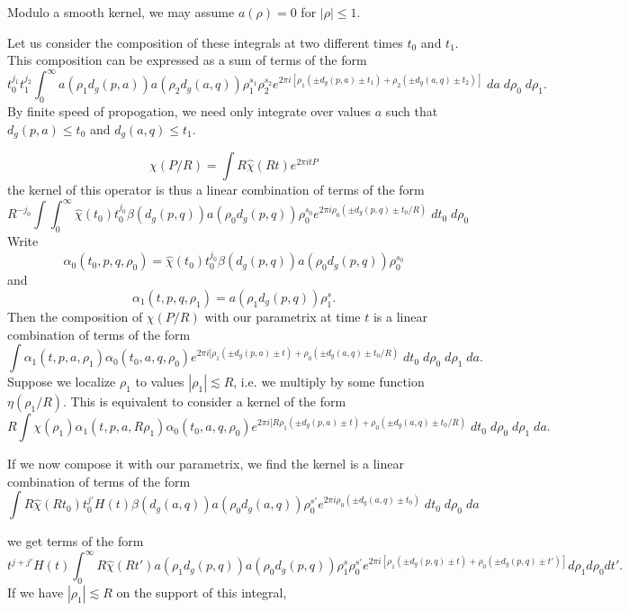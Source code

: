 Modulo a smooth kernel, we may assume $a(\rho) = 0$ for $|\rho| \leq 1$.

Let us consider the composition of these integrals at two different times $t_0$ and $t_1$. This composition can be expressed as a sum of terms of the form
%
\[ t_0^{j_1} t_1^{j_2} \int_0^\infty a( \rho_1 d_g(p,a) ) a( \rho_2 d_g(a,q) ) \rho_1^{s_1} \rho_2^{s_2} e^{2 \pi i [\rho_1 ( \pm d_g(p,a) \pm t_1) + \rho_2 ( \pm d_g(a,q) \pm t_2 )]}\; da\; d\rho_0\; d\rho_1. \]
%
By finite speed of propogation, we need only integrate over values $a$ such that $d_g(p,a) \leq t_0$ and $d_g(a,q) \leq t_1$.





\[ \chi(P / R) = \int R \widehat{\chi}(Rt) e^{2 \pi i t P} \]
%
the kernel of this operator is thus a linear combination of terms of the form
%
\[ R^{-j_0} \int \int_0^\infty \widehat{\chi}(t_0) t_0^{j_0} \beta(d_g(p,q)) a( \rho_0 d_g(p,q) ) \rho_0^{s_0} e^{2 \pi i \rho_0 ( \pm d_g(p,q) \pm t_0 / R )}\; dt_0\; d\rho_0 \]
%
Write
%
\[ \alpha_0(t_0,p,q,\rho_0) = \widehat{\chi}(t_0) t_0^{j_0} \beta(d_g(p,q)) a( \rho_0 d_g(p,q) ) \rho_0^{s_0} \]
%
and
%
\[ \alpha_1(t,p,q,\rho_1) = a(\rho_1 d_g(p,q)) \rho_1^s. \]
%
Then the composition of $\chi(P/R)$ with our parametrix at time $t$ is a linear combination of terms of the form
%
\[ \int \alpha_1(t,p,a,\rho_1) \alpha_0(t_0,a,q,\rho_0) e^{2 \pi i [ \rho_1 ( \pm d_g(p,a) \pm t ) + \rho_0 ( \pm d_g(a,q) \pm t_0 / R )}\; dt_0\; d\rho_0\; d\rho_1\; da. \]
%
Suppose we localize $\rho_1$ to values $|\rho_1| \lesssim R$, i.e. we multiply by some function $\eta( \rho_1 / R)$. This is equivalent to consider a kernel of the form
%
\[ R \int \chi(\rho_1) \alpha_1(t,p,a, R \rho_1) \alpha_0(t_0,a,q,\rho_0) e^{2 \pi i [ R \rho_1 ( \pm d_g(p,a) \pm t ) + \rho_0 ( \pm d_g(a,q) \pm t_0 / R )}\; dt_0\; d\rho_0\; d\rho_1\; da. \]


If we now compose it with our parametrix, we find the kernel is a linear combination of terms of the form
%
\[ \int R \widehat{\chi}(Rt_0) t_0^{j'} H(t) \beta(d_g(a,q)) a(\rho_0 d_g(a,q)) \rho_0^{s'} e^{2 \pi i \rho_0 ( \pm d_g(a,q) \pm t_0 )} \; dt_0\; d\rho_0\; da \]


we get terms of the form
%
\[ t^{j + j'} H(t) \int_0^\infty R \widehat{\chi}(Rt') a( \rho_1 d_g(p,q) ) a(\rho_0 d_g(p,q)) \rho_1^s \rho_0^{s'} e^{2 \pi i [\rho_1 ( \pm d_g(p,q) \pm t ) + \rho_0(\pm d_g(p,q) \pm t')]} d\rho_1 d\rho_0 dt'. \]
%
If we have $|\rho_1| \lesssim R$ on the support of this integral,

